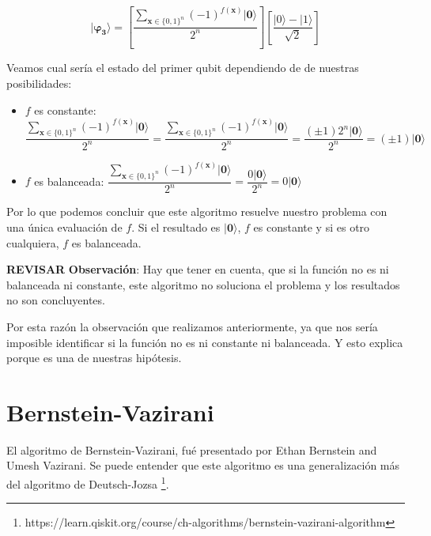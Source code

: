  \begin{equation}
     \mathbf{|\varphi_{3}\rangle}=\left[ \dfrac{\sum_{\mathbf{x} \in \{0,1\}^{n}}(-1)^{f(\mathbf{x})}|\mathbf{0}\rangle}{2^{n}}\right] \left[ \dfrac{|0\rangle - |1\rangle}{\sqrt{2}}\right]
 \end{equation}

 Veamos cual sería el estado del primer qubit dependiendo de de nuestras posibilidades:

 \begin{itemize}
     \item $f$ es constante:  $\dfrac{\sum_{\mathbf{x} \in \{0,1\}^{n}}(-1)^{f(\mathbf{x})}|\mathbf{0}\rangle}{2^{n}}=\dfrac{\sum_{\mathbf{x} \in \{0,1\}^{n}}(-1)^{f(\mathbf{x})}|\mathbf{0}\rangle}{2^{n}}=\dfrac{(\pm1)2^{n}|\mathbf{0}\rangle}{2^{n}}=(\pm1)|\mathbf{0}\rangle$

     \item $f$ es balanceada: 
     $\dfrac{\sum_{\mathbf{x} \in \{0,1\}^{n}}(-1)^{f(\mathbf{x})}|\mathbf{0}\rangle}{2^{n}}=\dfrac{0|\mathbf{0}\rangle}{2^{n}}=0|\mathbf{0}\rangle$
 \end{itemize}

 Por lo que podemos concluir que este algoritmo resuelve nuestro problema con una única evaluación de $f$. Si el resultado es $|\mathbf{0}\rangle$, $f$ es constante y si es otro cualquiera, $f$ es balanceada. \newline

 \textbf{REVISAR}\newline
 \textbf{Observación}: Hay que tener en cuenta, que si la función no es ni balanceada ni constante, este algoritmo no soluciona el problema y los resultados no son concluyentes.\newline

 Por esta razón la observación que realizamos anteriormente, ya que nos sería imposible identificar si la función no es ni constante ni balanceada. Y esto explica porque es una de nuestras hipótesis.

\section{Bernstein-Vazirani}
\label{Sec3.4:BV}

El algoritmo de Bernstein-Vazirani, fué presentado por Ethan Bernstein and Umesh Vazirani\cite{ARP:BV:1997}. Se puede entender que este algoritmo es una generalización más del algoritmo de Deutsch-Jozsa \footnote{https://learn.qiskit.org/course/ch-algorithms/bernstein-vazirani-algorithm}. \newline

